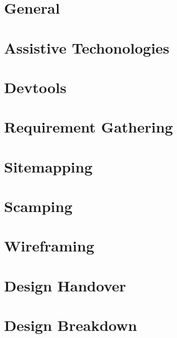 \documentclass[b5paper,openany]{book}
\begin{document}
\tp


\tableofcontents



\chapter{General}


\chapter{Assistive Techonologies}


\chapter{Devtools}


\chapter{Requirement Gathering}


\chapter{Sitemapping}


\chapter{Scamping}


\chapter{Wireframing}


\chapter{Design Handover}


\chapter{Design Breakdown}

\end{document}
